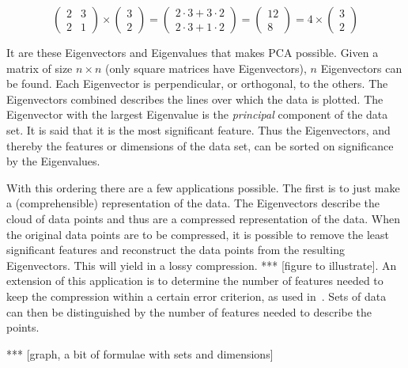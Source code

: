 \begin{equation}
	\label{eq:eigenvector}
	\begin{pmatrix} 2 & 3 \\ 2 & 1 \end{pmatrix}
	\times
	\begin{pmatrix} 3 \\ 2 \end{pmatrix}
	=
	\begin{pmatrix} 2 \cdot 3 + 3 \cdot 2 \\ 2 \cdot 3 + 1 \cdot 2
	\end{pmatrix}
	=
	\begin{pmatrix} 12 \\ 8 \end{pmatrix}
	=
	4 \times \begin{pmatrix} 3 \\ 2 \end{pmatrix}
\end{equation}

 It are these Eigenvectors and Eigenvalues that makes PCA possible.
 Given a matrix of size $n \times n$ (only square matrices have Eigenvectors), $n$ Eigenvectors can be found.
 Each Eigenvector is perpendicular, or orthogonal, to the others.
 The Eigenvectors combined describes the lines over which the data is plotted.
 The Eigenvector with the largest Eigenvalue is the \emph{principal} component of the data set.
 It is said that it is the most significant feature.
 Thus the Eigenvectors, and thereby the features or dimensions of the data set, can be sorted on significance by the Eigenvalues.

With this ordering there are a few applications possible.
The first is to just make a (comprehensible) representation of the data.
The Eigenvectors describe the cloud of data points and thus are a compressed representation of the data.
When the original data points are to be compressed, it is possible to remove the least significant features and reconstruct the data points from the resulting Eigenvectors.
This will yield in a lossy compression. *** [figure to illustrate].
An extension of this application is to determine the number of features needed to keep the compression within a certain error criterion, as used in~\cite{barbivc2004segmenting}.
Sets of data can then be distinguished by the number of features needed to describe the points.

*** [graph, a bit of formulae with sets and dimensions]




